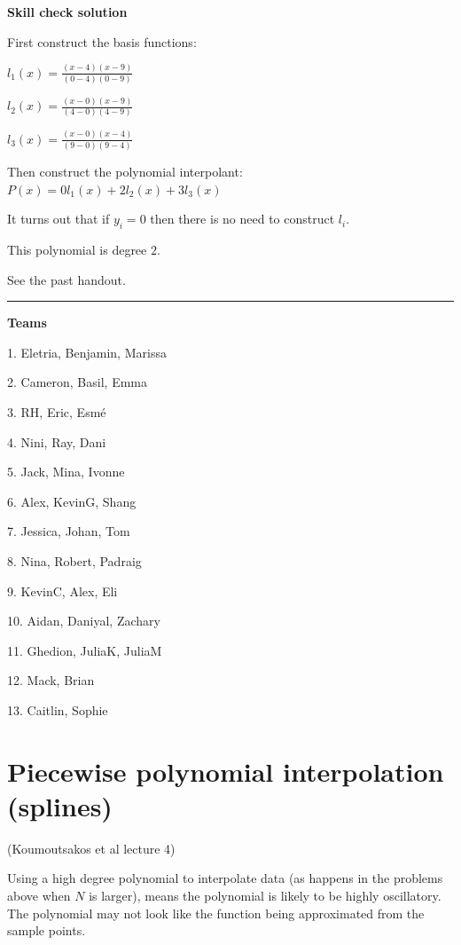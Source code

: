 \documentclass[12pt,letterpaper,noanswers]{exam}
\begin{document}
\noindent \textbf{Skill check solution}
\begin{questions}
\item First construct the basis functions:

$l_1(x) = \frac{(x-4)(x-9)}{(0-4)(0-9)}$


$l_2(x) = \frac{(x-0)(x-9)}{(4-0)(4-9)}$


$l_3(x) = \frac{(x-0)(x-4)}{(9-0)(9-4)}$

Then construct the polynomial interpolant:
$P(x) = 0l_1(x) + 2l_2(x) + 3l_3(x)$

It turns out that if $y_i = 0$ then there is no need to construct $l_i$.

This polynomial is degree $2$.

\item See the past handout.
\end{questions}
\vspace{0.2cm}
\hrule
\vspace{0.2cm}

\noindent \textbf{Teams}
\begin{multicols}{3}
1. Eletria, Benjamin, Marissa

2. Cameron, Basil, Emma

3. RH, Eric, Esmé

4. Nini, Ray, Dani

5. Jack, Mina, Ivonne

6. Alex, KevinG, Shang

7. Jessica, Johan, Tom

8. Nina, Robert, Padraig

9. KevinC, Alex, Eli

10.  Aidan, Daniyal, Zachary

11. Ghedion, JuliaK, JuliaM

12. Mack, Brian

13. Caitlin, Sophie

\end{multicols}

\section*{Piecewise polynomial interpolation (splines)}

(Koumoutsakos et al lecture 4)

Using a high degree polynomial to interpolate data (as happens in the problems above when $N$ is larger), means the polynomial is likely to be highly oscillatory.  The polynomial may not look like the function being approximated from the sample points.
\end{document}
